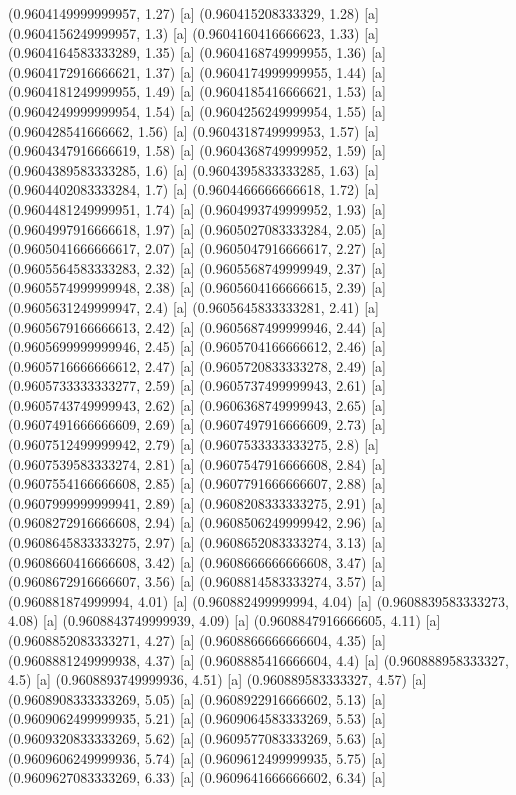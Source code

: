 {{{(0.9604149999999957, 1.27) [a] 
(0.960415208333329, 1.28) [a] 
(0.9604156249999957, 1.3) [a] 
(0.9604160416666623, 1.33) [a] 
(0.9604164583333289, 1.35) [a] 
(0.9604168749999955, 1.36) [a] 
(0.9604172916666621, 1.37) [a] 
(0.9604174999999955, 1.44) [a] 
(0.9604181249999955, 1.49) [a] 
(0.9604185416666621, 1.53) [a] 
(0.9604249999999954, 1.54) [a] 
(0.9604256249999954, 1.55) [a] 
(0.960428541666662, 1.56) [a] 
(0.9604318749999953, 1.57) [a] 
(0.9604347916666619, 1.58) [a] 
(0.9604368749999952, 1.59) [a] 
(0.9604389583333285, 1.6) [a] 
(0.9604395833333285, 1.63) [a] 
(0.9604402083333284, 1.7) [a] 
(0.9604466666666618, 1.72) [a] 
(0.9604481249999951, 1.74) [a] 
(0.9604993749999952, 1.93) [a] 
(0.9604997916666618, 1.97) [a] 
(0.9605027083333284, 2.05) [a] 
(0.9605041666666617, 2.07) [a] 
(0.9605047916666617, 2.27) [a] 
(0.9605564583333283, 2.32) [a] 
(0.9605568749999949, 2.37) [a] 
(0.9605574999999948, 2.38) [a] 
(0.9605604166666615, 2.39) [a] 
(0.9605631249999947, 2.4) [a] 
(0.9605645833333281, 2.41) [a] 
(0.9605679166666613, 2.42) [a] 
(0.9605687499999946, 2.44) [a] 
(0.9605699999999946, 2.45) [a] 
(0.9605704166666612, 2.46) [a] 
(0.9605716666666612, 2.47) [a] 
(0.9605720833333278, 2.49) [a] 
(0.9605733333333277, 2.59) [a] 
(0.9605737499999943, 2.61) [a] 
(0.9605743749999943, 2.62) [a] 
(0.9606368749999943, 2.65) [a] 
(0.9607491666666609, 2.69) [a] 
(0.9607497916666609, 2.73) [a] 
(0.9607512499999942, 2.79) [a] 
(0.9607533333333275, 2.8) [a] 
(0.9607539583333274, 2.81) [a] 
(0.9607547916666608, 2.84) [a] 
(0.9607554166666608, 2.85) [a] 
(0.9607791666666607, 2.88) [a] 
(0.9607999999999941, 2.89) [a] 
(0.9608208333333275, 2.91) [a] 
(0.9608272916666608, 2.94) [a] 
(0.9608506249999942, 2.96) [a] 
(0.9608645833333275, 2.97) [a] 
(0.9608652083333274, 3.13) [a] 
(0.9608660416666608, 3.42) [a] 
(0.9608666666666608, 3.47) [a] 
(0.9608672916666607, 3.56) [a] 
(0.9608814583333274, 3.57) [a] 
(0.960881874999994, 4.01) [a] 
(0.960882499999994, 4.04) [a] 
(0.9608839583333273, 4.08) [a] 
(0.9608843749999939, 4.09) [a] 
(0.9608847916666605, 4.11) [a] 
(0.9608852083333271, 4.27) [a] 
(0.9608866666666604, 4.35) [a] 
(0.9608881249999938, 4.37) [a] 
(0.9608885416666604, 4.4) [a] 
(0.960888958333327, 4.5) [a] 
(0.9608893749999936, 4.51) [a] 
(0.960889583333327, 4.57) [a] 
(0.9608908333333269, 5.05) [a] 
(0.9608922916666602, 5.13) [a] 
(0.9609062499999935, 5.21) [a] 
(0.9609064583333269, 5.53) [a] 
(0.9609320833333269, 5.62) [a] 
(0.9609577083333269, 5.63) [a] 
(0.9609606249999936, 5.74) [a] 
(0.9609612499999935, 5.75) [a] 
(0.9609627083333269, 6.33) [a] 
(0.9609641666666602, 6.34) [a] 
}}}
